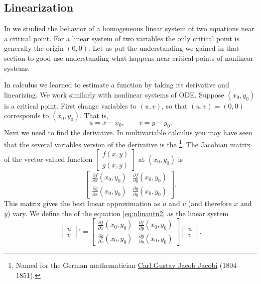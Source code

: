 \subsection{Linearization}

In  we studied the behavior of a homogeneous
linear system of two equations near a critical point.  For a linear system
of two variables the only critical point is generally the origin $(0,0)$.
Let us put the understanding we gained in that section to good use
understanding what happens near critical points of nonlinear systems.

In calculus we learned to estimate a function by taking its
derivative and linearizing.  We work similarly with nonlinear systems of ODE.
Suppose $(x_0,y_0)$ is a critical point.
First change variables to $(u,v)$, so that $(u,v)=(0,0)$ corresponds to
$(x_0,y_0)$.  That is,
\begin{equation*}
u=x-x_0, \qquad v=y-y_0 .
\end{equation*}
Next we need to find the derivative.  In multivariable calculus you may
have seen that the several variables version of the derivative is the
\emph{}%
\footnote{Named for the German mathematician
\href{https://en.wikipedia.org/wiki/Carl_Gustav_Jacob_Jacobi}{Carl Gustav Jacob Jacobi}
(1804--1851).}.   The Jacobian matrix of 
the vector-valued function
$\left[ \begin{smallmatrix} f(x,y) \\ g(x,y) \end{smallmatrix} \right]$
at $(x_0,y_0)$ is 
\begin{equation*}
\begin{bmatrix}
\frac{\partial f}{\partial x}(x_0,y_0) &
\frac{\partial f}{\partial y}(x_0,y_0) \\
\frac{\partial g}{\partial x}(x_0,y_0) &
\frac{\partial g}{\partial y}(x_0,y_0)
\end{bmatrix} .
\end{equation*}
This matrix gives the best linear approximation as $u$ and $v$ (and
therefore $x$ and $y$) vary.  
We define the \emph{} of the equation
\eqref{eq:nlinautn2} as the linear system
\begin{equation*}
\begin{bmatrix} u \\ v \end{bmatrix} ' =
\begin{bmatrix}
\frac{\partial f}{\partial x}(x_0,y_0) &
\frac{\partial f}{\partial y}(x_0,y_0) \\
\frac{\partial g}{\partial x}(x_0,y_0) &
\frac{\partial g}{\partial y}(x_0,y_0)
\end{bmatrix} 
\begin{bmatrix} u \\ v \end{bmatrix} .
\end{equation*}

